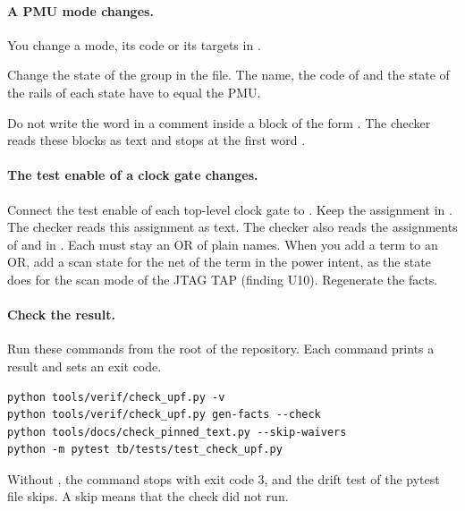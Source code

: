 \paragraph{A PMU mode changes.} You change a mode, its code or its targets in .
\begin{procedure}
  \item Change the state of the group  in the file. The name, the code of  and the state of the rails of each state have to equal the PMU.
  \item Do not write the word  in a comment inside a block of the form . The checker reads these blocks as text and stops at the first word .
\end{procedure}

\paragraph{The test enable of a clock gate changes.} Connect the test enable of each top-level clock gate to . Keep the assignment  in . The checker reads this assignment as text. The checker also reads the assignments of  and  in . Each must stay an OR of plain names. When you add a term to an OR, add a scan state for the net of the term in the power intent, as the state  does for the scan mode of the JTAG TAP (finding U10). Regenerate the facts.

\paragraph{Check the result.} Run these commands from the root of the repository. Each command prints a result and sets an exit code.
\begin{lstlisting}
python tools/verif/check_upf.py -v
python tools/verif/check_upf.py gen-facts --check
python tools/docs/check_pinned_text.py --skip-waivers
python -m pytest tb/tests/test_check_upf.py
\end{lstlisting}
Without , the command  stops with exit code 3, and the drift test of the pytest file skips. A skip means that the check did not run.

